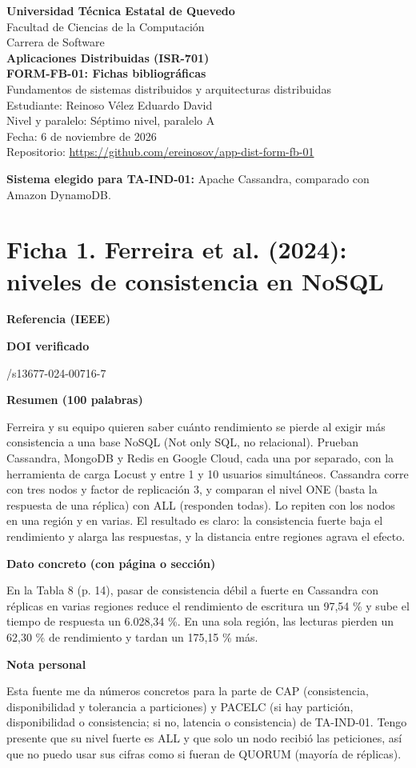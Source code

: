 \documentclass[11pt,a4paper]{article}
\newcommand{\campo}[1]{\par\medskip\noindent\textbf{#1}\par\smallskip}
\begin{document}
	
	\begin{center}
		{\Large\textbf{Universidad T\'ecnica Estatal de Quevedo}}\\[4pt]
		Facultad de Ciencias de la Computaci\'on\\
		Carrera de Software\\[12pt]
		\textbf{Aplicaciones Distribuidas (ISR-701)}\\
		\textbf{FORM-FB-01: Fichas bibliogr\'aficas}\\
		Fundamentos de sistemas distribuidos y arquitecturas distribuidas\\[12pt]
		Estudiante: Reinoso V\'elez Eduardo David\\
		Nivel y paralelo: S\'eptimo nivel, paralelo A\\
		Fecha: 6 de noviembre de 2026\\
		Repositorio: \url{https://github.com/ereinosov/app-dist-form-fb-01}
	\end{center}
	
	\bigskip
	\noindent\textbf{Sistema elegido para TA-IND-01:} Apache Cassandra, comparado con Amazon DynamoDB.
	
	\section*{Ficha 1. Ferreira et al. (2024): niveles de consistencia en NoSQL}
	\campo{Referencia (IEEE)}
	\campo{DOI verificado}
	10.1186/s13677-024-00716-7
	\campo{Resumen (100 palabras)}
	Ferreira y su equipo quieren saber cuánto rendimiento se pierde al exigir más consistencia a una base NoSQL (Not only SQL, no relacional). Prueban Cassandra, MongoDB y Redis en Google Cloud, cada una por separado, con la herramienta de carga Locust y entre 1 y 10 usuarios simultáneos. Cassandra corre con tres nodos y factor de replicación 3, y comparan el nivel ONE (basta la respuesta de una réplica) con ALL (responden todas). Lo repiten con los nodos en una región y en varias. El resultado es claro: la consistencia fuerte baja el rendimiento y alarga las respuestas, y la distancia entre regiones agrava el efecto.
	\campo{Dato concreto (con p\'agina o secci\'on)}
	En la Tabla 8 (p. 14), pasar de consistencia débil a fuerte en Cassandra con réplicas en varias regiones reduce el rendimiento de escritura un 97,54 \% y sube el tiempo de respuesta un 6.028,34 \%. En una sola región, las lecturas pierden un 62,30 \% de rendimiento y tardan un 175,15 \% más.
	\campo{Nota personal}
	Esta fuente me da números concretos para la parte de CAP (consistencia, disponibilidad y tolerancia a particiones) y PACELC (si hay partición, disponibilidad o consistencia; si no, latencia o consistencia) de TA-IND-01. Tengo presente que su nivel fuerte es ALL y que solo un nodo recibió las peticiones, así que no puedo usar sus cifras como si fueran de QUORUM (mayoría de réplicas).
	
\end{document}
